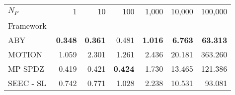 \begin{tabular}{lrrrrrr}
\toprule
$N_P$ & 1 & 10 & 100 & 1,000 & 10,000 & 100,000 \\
Framework &  &  &  &  &  &  \\
\midrule
ABY~\cite{DSZ15} & \bfseries 0.348 & \bfseries 0.361 & 0.481 & \bfseries 1.016 & \bfseries 6.763 & \bfseries 63.313 \\
MOTION~\cite{BDST22} & 1.059 & 2.301 & 1.261 & 2.436 & 20.181 & 363.260 \\
MP-SPDZ~\cite{CCS:Keller20} & 0.419 & 0.421 & \bfseries 0.424 & 1.730 & 13.465 & 121.386 \\
SEEC - SL & 0.742 & 0.771 & 1.028 & 2.238 & 10.531 & 93.081 \\
\bottomrule
\end{tabular}

